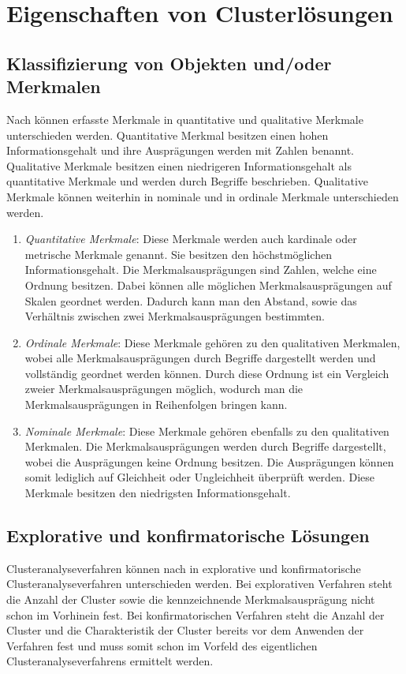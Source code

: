 \chapter{Eigenschaften von Clusterlösungen}

\section{Klassifizierung von Objekten und/oder Merkmalen}
Nach \citet[S. 158-163]{Bankhofer.2008} können erfasste Merkmale in quantitative und qualitative Merkmale unterschieden werden.
Quantitative Merkmal besitzen einen hohen Informationsgehalt und ihre Ausprägungen werden mit Zahlen benannt. Qualitative Merkmale besitzen einen niedrigeren Informationsgehalt als quantitative Merkmale und werden durch Begriffe beschrieben. Qualitative Merkmale können weiterhin in nominale und in ordinale Merkmale unterschieden werden.

\begin{enumerate}
        \item \textit{Quantitative Merkmale}: Diese Merkmale werden auch kardinale oder metrische Merkmale genannt. Sie besitzen den höchstmöglichen Informationsgehalt. Die Merkmalsausprägungen sind Zahlen, welche eine Ordnung besitzen. Dabei können alle möglichen Merkmalsausprägungen auf Skalen geordnet werden. Dadurch kann man den Abstand, sowie das Verhältnis zwischen zwei Merkmalsausprägungen bestimmten.
        \item \textit{Ordinale Merkmale}: Diese Merkmale gehören zu den qualitativen Merkmalen, wobei alle Merkmalsausprägungen durch Begriffe dargestellt werden und vollständig geordnet werden können. Durch diese Ordnung ist ein Vergleich zweier Merkmalsausprägungen möglich, wodurch man die Merkmalsausprägungen in Reihenfolgen bringen kann.
        \item \textit{Nominale Merkmale}: Diese Merkmale gehören ebenfalls zu den qualitativen Merkmalen. Die Merkmalsausprägungen werden durch Begriffe dargestellt, wobei die Ausprägungen keine Ordnung besitzen. Die Ausprägungen können somit lediglich auf Gleichheit oder Ungleichheit überprüft werden. Diese Merkmale besitzen den niedrigsten Informationsgehalt.
\end{enumerate}

\section{Explorative und konfirmatorische Lösungen}
Clusteranalyseverfahren können nach \citet[S. 22]{Bacher.2010} in explorative und konfirmatorische Clusteranalyseverfahren unterschieden werden. 
Bei explorativen Verfahren steht die Anzahl der Cluster sowie die kennzeichnende Merkmalsausprägung nicht schon im Vorhinein fest.
Bei konfirmatorischen Verfahren steht die Anzahl der Cluster und die Charakteristik der Cluster bereits vor dem Anwenden der Verfahren fest und muss somit schon im Vorfeld des eigentlichen Clusteranalyseverfahrens ermittelt werden.

